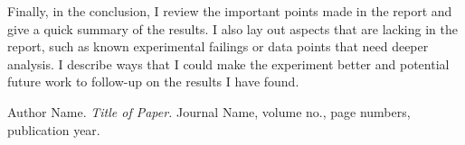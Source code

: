\documentclass[preprint]{aastex}
\begin{document}
Finally, in the conclusion, I review the important points made in the report 
and give a quick summary of the results. I also lay out aspects that are 
lacking in the report, such as known experimental failings or data points that 
need deeper analysis. I describe ways that I could make the experiment better 
and potential future work to follow-up on the results I have found.

\begin{thebibliography}{0}
  Author Name. \emph{Title of Paper.} Journal Name, volume no., page numbers, 
  publication year.
\end{thebibliography}
\end{document}
